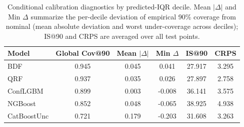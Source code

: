 \begin{table}[htbp]
\centering
\caption{Conditional calibration diagnostics by predicted-IQR decile. Mean $|\Delta|$ and Min $\Delta$ summarize the per-decile deviation of empirical 90\% coverage from nominal (mean absolute deviation and worst under-coverage across deciles); IS@90 and CRPS are averaged over all test points.}
\label{tab:conditional-diagnostics}
\begin{tabular}{lccccc}
\toprule
Model & Global Cov@90 & Mean $|\Delta|$ & Min $\Delta$ & IS@90 & CRPS \\
\midrule
BDF & 0.945 & 0.045 & 0.041 & 27.917 & 3.295 \\
QRF & 0.937 & 0.035 & 0.026 & 27.897 & 2.758 \\
ConfLGBM & 0.899 & 0.003 & -0.008 & 36.141 & 3.575 \\
NGBoost & 0.852 & 0.048 & -0.065 & 38.925 & 4.938 \\
CatBoostUnc & 0.721 & 0.179 & -0.203 & 31.608 & 3.263 \\
\bottomrule
\end{tabular}
\end{table}
